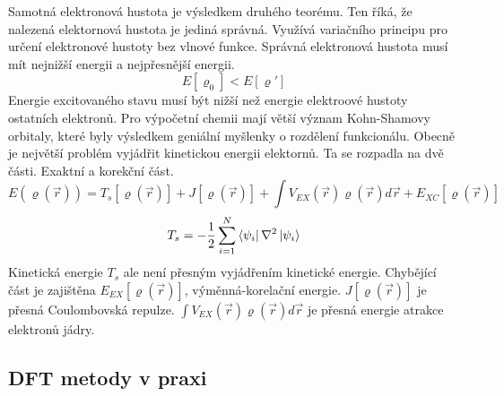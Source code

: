 \documentclass[
  digital, %
  table,   %
  lof,     %
  lot,     %
  oneside,
]{fithesis3}
\begin{document}
Samotná elektronová hustota je výsledkem druhého teorému. Ten říká, že nalezená elektornová hustota je jediná správná. Využívá variačního principu pro určení elektronové hustoty bez vlnové funkce. Správná elektronová hustota musí mít nejnižší energii a nejpřesnější energii.
\begin{equation}
E [\varrho_0] < E[\varrho ']
\end{equation}
 Energie excitovaného stavu musí být nižší než energie elektroové hustoty ostatních elektronů. Pro výpočetní chemii mají větší význam Kohn-Shamovy orbitaly, které byly výsledkem geniální myšlenky o rozdělení funkcionálu. Obecně je největší problém vyjádřit kinetickou energii elektornů. Ta se rozpadla na dvě části. Exaktní a korekční část.
\begin{equation}
E(\varrho(\vec{r})) = T_s[\varrho(\vec{r})] + J[\varrho(\vec{r})] + \int V_{EX}(\vec{r})\varrho(\vec{r})d\vec{r} + E_{XC}[\varrho(\vec{r})]
\end{equation}
 \cite{jensen2007introduction}\cite{koch2000chemist}
 \begin{equation}
 T_s = -\frac{1}{2} \sum_{i=1}^{N}  \bra{\psi_i}{\nabla^{2}}\ket{\psi_i}
 \label{kineticka_energie_jednoelektronova}
 \end{equation}
 Kinetická energie $T_s$ ale není přesným vyjádřením kinetické energie. Chybějící část je zajištěna $E_{EX}[\varrho(\vec{r})]$, výměnná-korelační energie. $J[\varrho(\vec{r})]$ je přesná Coulombovská repulze. $\int V_{EX}(\vec{r})\varrho(\vec{r})d\vec{r}$ je přesná energie atrakce elektronů jádry.  \cite{parr1994density}

\subsection{DFT metody v praxi}
\end{document}
